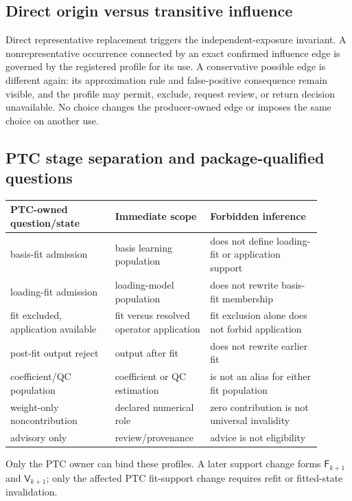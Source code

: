 \subsection{Direct origin versus transitive influence}

Direct representative replacement triggers the independent-exposure
invariant. A nonrepresentative occurrence connected by an exact confirmed
influence edge is governed by the registered profile for its use. A
conservative possible edge is different again: its approximation rule and
false-positive consequence remain visible, and the profile may permit,
exclude, request review, or return decision unavailable. No choice changes
the producer-owned edge or imposes the same choice on another use.

\subsection{PTC stage separation and package-qualified questions}

\begin{center}
\begin{tabular}{p{0.31\linewidth}p{0.26\linewidth}p{0.33\linewidth}}
\toprule
PTC-owned question/state & Immediate scope & Forbidden inference \\
\midrule
basis-fit admission & basis learning population & does not define loading-fit
or application support \\
loading-fit admission & loading-model population & does not rewrite basis-fit
membership \\
fit excluded, application available & fit versus resolved operator application
& fit exclusion alone does not forbid application \\
post-fit output reject & output after fit & does not rewrite earlier fit \\
coefficient/QC population & coefficient or QC estimation & is not an alias for
either fit population \\
weight-only noncontribution & declared numerical role & zero contribution is
not universal invalidity \\
advisory only & review/provenance & advice is not eligibility \\
\bottomrule
\end{tabular}
\end{center}
Only the PTC owner can bind these profiles. A later support change forms
$\mathsf F_{k+1}$ and $\mathsf V_{k+1}$; only the affected PTC fit-support
change requires refit or fitted-state invalidation.

